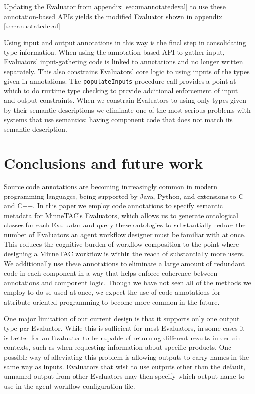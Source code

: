 \documentclass{article}
\begin{document}
Updating the Evaluator from appendix \ref{sec:unannotatedeval} to use these annotation-based APIs yields the modified Evaluator shown in appendix \ref{sec:annotatedeval}.

Using input and output annotations in this way is the final step in consolidating type information.
When using the annotation-based API to gather input, Evaluators' input-gathering code is linked to annotations and no longer written separately.
This also constrains Evaluators' core logic to using inputs of the types given in annotations.
The \texttt{populateInputs} procedure call provides a point at which to do runtime type checking to provide additional enforcement of input and output constraints.
When we constrain Evaluators to using only types given by their semantic descriptions we eliminate one of the most serious problems with systems that use semantics:  having component code that does not match its semantic description.

\section{Conclusions and future work}

Source code annotations are becoming increasingly common in modern programming languages, being supported by Java, Python, and extensions to C and C++.
In this paper we employ code annotations to specify semantic metadata for MinneTAC's Evaluators, which allows us to generate ontological classes for each Evaluator and query these ontologies to substantially reduce the number of Evaluators an agent workflow designer must be familiar with at once.
This reduces the cognitive burden of workflow composition to the point where designing a MinneTAC workflow is within the reach of substantially more users.
We additionally use these annotations to eliminate a large amount of redundant code in each component in a way that helps enforce coherence between annotations and component logic.
Though we have not seen all of the methods we employ to do so used at once, we expect the use of code annotations for attribute-oriented programming to become more common in the future.

One major limitation of our current design is that it supports only one output type per Evaluator.
While this is sufficient for most Evaluators, in some cases it is better for an Evaluator to be capable of returning different results in certain contexts, such as when requesting information about specific products.
One possible way of alleviating this problem is allowing outputs to carry names in the same way as inputs.
Evaluators that wish to use outputs other than the default, unnamed output from other Evaluators may then specify which output name to use in the agent workflow configuration file.
\end{document}
